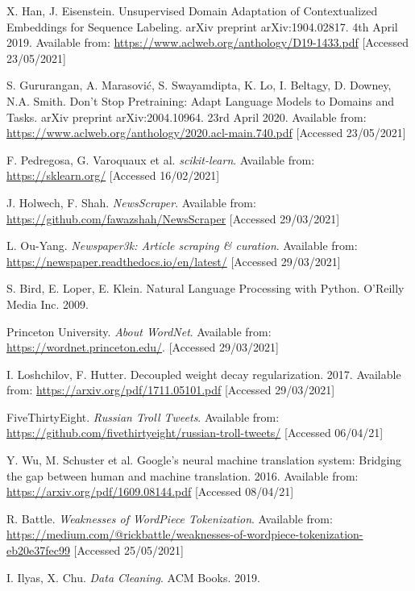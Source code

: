 \begin{thebibliography}{9}
X. Han, J. Eisenstein. Unsupervised Domain Adaptation of Contextualized Embeddings for Sequence Labeling. arXiv preprint arXiv:1904.02817. 4th April 2019. Available from: \url{https://www.aclweb.org/anthology/D19-1433.pdf} [Accessed 23/05/2021]

S. Gururangan, A. Marasović, S. Swayamdipta, K. Lo, I. Beltagy, D. Downey, N.A. Smith. Don't Stop Pretraining: Adapt Language Models to Domains and Tasks. arXiv preprint arXiv:2004.10964. 23rd April 2020. Available from: \url{https://www.aclweb.org/anthology/2020.acl-main.740.pdf} [Accessed 23/05/2021]

F. Pedregosa, G. Varoquaux et al. \textit{scikit-learn}. Available from: \url{https://sklearn.org/} [Accessed 16/02/2021]

J. Holwech, F. Shah. \textit{NewsScraper}. Available from: \url{https://github.com/fawazshah/NewsScraper} [Accessed 29/03/2021]

L. Ou-Yang. \textit{Newspaper3k: Article scraping \& curation}. Available from: \url{https://newspaper.readthedocs.io/en/latest/} [Accessed 29/03/2021]

S. Bird, E. Loper, E. Klein. Natural Language Processing with Python. O’Reilly Media Inc. 2009.

Princeton University. \textit{About WordNet}. Available from: \url{https://wordnet.princeton.edu/}. [Accessed 29/03/2021]

I. Loshchilov, F. Hutter. Decoupled weight decay regularization. 2017. Available from: \url{https://arxiv.org/pdf/1711.05101.pdf} [Accessed 29/03/2021]

FiveThirtyEight. \textit{Russian Troll Tweets}. Available from: \url{https://github.com/fivethirtyeight/russian-troll-tweets/} [Accessed 06/04/21]

Y. Wu, M. Schuster et al. Google's neural machine translation system: Bridging the gap between human and machine translation. 2016. Available from: \url{https://arxiv.org/pdf/1609.08144.pdf} [Accessed 08/04/21]

R. Battle. \textit{Weaknesses of WordPiece Tokenization}. Available from: \url{https://medium.com/@rickbattle/weaknesses-of-wordpiece-tokenization-eb20e37fec99} [Accessed 25/05/2021]

I. Ilyas, X. Chu. \textit{Data Cleaning}. ACM Books. 2019.


\end{thebibliography}
